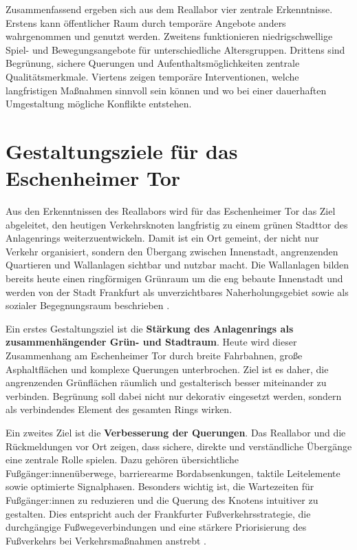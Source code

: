 \documentclass[a4paper,12pt]{article}
\begin{document}
Zusammenfassend ergeben sich aus dem Reallabor vier zentrale Erkenntnisse. Erstens kann öffentlicher Raum durch temporäre Angebote anders wahrgenommen und genutzt werden. Zweitens funktionieren niedrigschwellige Spiel- und Bewegungsangebote für unterschiedliche Altersgruppen. Drittens sind Begrünung, sichere Querungen und Aufenthaltsmöglichkeiten zentrale Qualitätsmerkmale. Viertens zeigen temporäre Interventionen, welche langfristigen Maßnahmen sinnvoll sein können und wo bei einer dauerhaften Umgestaltung mögliche Konflikte entstehen.

\FloatBarrier
\section{Gestaltungsziele für das Eschenheimer Tor}

Aus den Erkenntnissen des Reallabors wird für das Eschenheimer Tor das Ziel abgeleitet, den heutigen Verkehrsknoten langfristig zu einem grünen Stadttor des Anlagenrings weiterzuentwickeln. Damit ist ein Ort gemeint, der nicht nur Verkehr organisiert, sondern den Übergang zwischen Innenstadt, angrenzenden Quartieren und Wallanlagen sichtbar und nutzbar macht. Die Wallanlagen bilden bereits heute einen ringförmigen Grünraum um die eng bebaute Innenstadt und werden von der Stadt Frankfurt als unverzichtbares Naherholungsgebiet sowie als sozialer Begegnungsraum beschrieben \autocite{stadtfrankfurtwallanlagen2026}.

Ein erstes Gestaltungsziel ist die \textbf{Stärkung des Anlagenrings als zusammenhängender Grün- und Stadtraum}. Heute wird dieser Zusammenhang am Eschenheimer Tor durch breite Fahrbahnen, große Asphaltflächen und komplexe Querungen unterbrochen. Ziel ist es daher, die angrenzenden Grünflächen räumlich und gestalterisch besser miteinander zu verbinden. Begrünung soll dabei nicht nur dekorativ eingesetzt werden, sondern als verbindendes Element des gesamten Rings wirken.

Ein zweites Ziel ist die \textbf{Verbesserung der Querungen}. Das Reallabor und die Rückmeldungen vor Ort zeigen, dass sichere, direkte und verständliche Übergänge eine zentrale Rolle spielen. Dazu gehören übersichtliche Fußgänger:innenüberwege, barrierearme Bordabsenkungen, taktile Leitelemente sowie optimierte Signalphasen. Besonders wichtig ist, die Wartezeiten für Fußgänger:innen zu reduzieren und die Querung des Knotens intuitiver zu gestalten. Dies entspricht auch der Frankfurter Fußverkehrsstrategie, die durchgängige Fußwegeverbindungen und eine stärkere Priorisierung des Fußverkehrs bei Verkehrsmaßnahmen anstrebt \autocite{stadtfrankfurtfussverkehr2026}.
\end{document}
